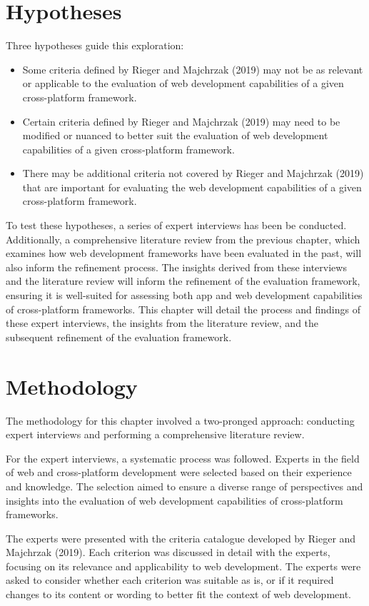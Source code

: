 \section{Hypotheses}
Three hypotheses guide this exploration:

\begin{itemize}
    \item Some criteria defined by Rieger and Majchrzak (2019) may not be as relevant or applicable to the evaluation of web development capabilities of a given cross-platform framework.
    \item Certain criteria defined by Rieger and Majchrzak (2019) may need to be modified or nuanced to better suit the evaluation of web development capabilities of a given cross-platform framework.
    \item There may be additional criteria not covered by Rieger and Majchrzak (2019) that are important for evaluating the web development capabilities of a given cross-platform framework.
\end{itemize}

To test these hypotheses, a series of expert interviews has been be conducted. Additionally, a comprehensive literature review from the previous chapter, which examines how web development frameworks have been evaluated in the past, will also inform the refinement process. The insights derived from these interviews and the literature review will inform the refinement of the evaluation framework, ensuring it is well-suited for assessing both app and web development capabilities of cross-platform frameworks. This chapter will detail the process and findings of these expert interviews, the insights from the literature review, and the subsequent refinement of the evaluation framework.

\section{Methodology}
The methodology for this chapter involved a two-pronged approach: conducting expert interviews and performing a comprehensive literature review. 

For the expert interviews, a systematic process was followed. Experts in the field of web and cross-platform development were selected based on their experience and knowledge. The selection aimed to ensure a diverse range of perspectives and insights into the evaluation of web development capabilities of cross-platform frameworks.

The experts were presented with the criteria catalogue developed by Rieger and Majchrzak (2019). Each criterion was discussed in detail with the experts, focusing on its relevance and applicability to web development. The experts were asked to consider whether each criterion was suitable as is, or if it required changes to its content or wording to better fit the context of web development. 

